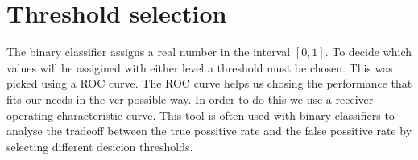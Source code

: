 \begin{figure}[h]
  \begin{center}
  \end{center}
\end{figure}


\section{Threshold selection}

The binary classifier assigns a real number in the interval $[0,1]$. To decide which values will be assigined with either level a threshold must be chosen. This was picked using a ROC curve. The ROC curve helps us chosing the performance that fits our needs in the ver possible way. In order to do this we use a receiver operating characteristic curve. This tool is often used with binary classifiers to analyse the tradeoff between the true possitive rate and the false possitive rate by selecting different desicion thresholds.

\begin{figure}[h]
  \begin{center}
  \end{center}
\end{figure}

